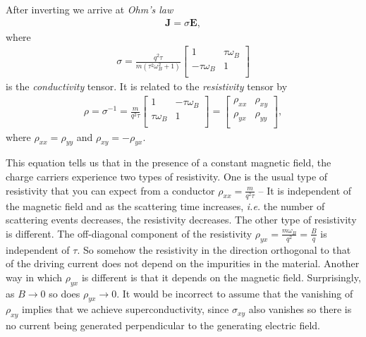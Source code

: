         After inverting we arrive at \textit{Ohm's law}
        \begin{align}
            \bm{J}=\sigma \bm{E},
        \end{align}
        where
        \begin{align}
            \sigma=\frac{q^2 \tau }{m \left(\tau ^2 \omega_B ^2+1\right)}
\begin{bmatrix}
 1 & \tau  \omega_B  \\
 -\tau  \omega_B  & 1 \\
\end{bmatrix}
        \end{align}
         is the \textit{conductivity} tensor. It is related to the \textit{resistivity} tensor by
         \begin{align}
            \rho = \sigma^{-1}= \frac{m}{q^2 \tau } \begin{bmatrix}
 1 & -\tau  \omega_B  \\
 \tau  \omega_B  & 1 \\
            \end{bmatrix} = \begin{bmatrix}
                \rho_{xx} & \rho_{xy} \\
                \rho_{yx} & \rho_{yy} \\
            \end{bmatrix},
         \end{align}
         where $\rho_{xx} =\rho_{yy}$ and $\rho_{xy} = - \rho_{yx}$.

         This equation tells us that in the presence of a constant magnetic field, the charge carriers experience two types of resistivity. One is the usual type of resistivity that you can expect from a conductor $\rho_{xx} = \frac{m}{q^2\tau}$ -- It is independent of the magnetic field and as the scattering time increases, \textit{i.e.} the number of scattering events decreases, the resistivity decreases. The other type of resistivity is different. The off-diagonal component of the resistivity $\rho_{yx} = \frac{m \omega_B}{q^2}= \frac{B}{q}$ is independent of $\tau$. So somehow the resistivity in the direction orthogonal to that of the driving current does not depend on the impurities in the material. Another way in which $\rho_{yx}$ is different is that it depends on the magnetic field. Surprisingly, as $B\rightarrow 0$ so does $\rho_{yx} \rightarrow 0$. It would be incorrect to assume that the vanishing of $\rho_{xy}$ implies that we achieve superconductivity, since $\sigma_{xy}$ also vanishes so there is no current being generated perpendicular to the generating electric field.

